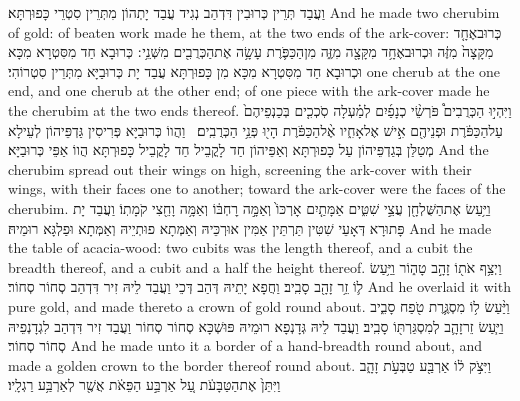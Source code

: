 {וַעֲבַד תְּרֵין כְּרוּבִין דִּדְהַב נְגִיד עֲבַד יָתְהוֹן מִתְּרֵין סִטְרֵי כָּפוּרְתָּא׃}
{And he made two cherubim of gold: of beaten work made he them, at the two ends of the ark-cover:}{}
{כְּרוּב\maqqaf אֶחָ֤ד מִקָּצָה֙ מִזֶּ֔ה וּכְרוּב\maqqaf אֶחָ֥ד מִקָּצָ֖ה מִזֶּ֑ה מִן\maqqaf הַכַּפֹּ֛רֶת עָשָׂ֥ה אֶת\maqqaf הַכְּרֻבִ֖ים מִשְּׁנֵ֥י ׃}
{כְּרוּבָא חַד מִסִּטְרָא מִכָּא וּכְרוּבָא חַד מִסִּטְרָא מִכָּא מִן כָּפוּרְתָּא עֲבַד יָת כְּרוּבַיָּא מִתְּרֵין סִטְרוֹהִי׃}
{one cherub at the one end, and one cherub at the other end; of one piece with the ark-cover made he the cherubim at the two ends thereof.}{}
{וַיִּהְי֣וּ הַכְּרֻבִים֩ פֹּרְשֵׂ֨י כְנָפַ֜יִם לְמַ֗עְלָה סֹֽכְכִ֤ים בְּכַנְפֵיהֶם֙ עַל\maqqaf הַכַּפֹּ֔רֶת וּפְנֵיהֶ֖ם אִ֣ישׁ אֶל\maqqaf אָחִ֑יו אֶ֨ל\maqqaf הַכַּפֹּ֔רֶת הָי֖וּ פְּנֵ֥י הַכְּרֻבִֽים׃ \petucha }
{וַהֲווֹ כְּרוּבַיָּא פְּרִיסִין גַּדְפֵּיהוֹן לְעֵילָא מְטַלַּן בְּגַדְפֵּיהוֹן עַל כָּפוּרְתָּא וְאַפֵּיהוֹן חַד לָקֳבֵיל חַד לָקֳבֵיל כָּפוּרְתָּא הֲווֹ אַפֵּי כְּרוּבַיָּא׃}
{And the cherubim spread out their wings on high, screening the ark-cover with their wings, with their faces one to another; toward the ark-cover were the faces of the cherubim.}{}
{וַיַּ֥עַשׂ אֶת\maqqaf הַשֻּׁלְחָ֖ן עֲצֵ֣י שִׁטִּ֑ים אַמָּתַ֤יִם אׇרְכּוֹ֙ וְאַמָּ֣ה רׇחְבּ֔וֹ וְאַמָּ֥ה וָחֵ֖צִי קֹמָתֽוֹ׃}
{וַעֲבַד יָת פָּתוּרָא דְּאָעֵי שִׁטִּין תַּרְתֵּין אַמִּין אוּרְכֵּיהּ וְאַמְּתָא פוּתְיֵיהּ וְאַמְּתָא וּפַלְגָּא רוּמֵיהּ׃}
{And he made the table of acacia-wood: two cubits was the length thereof, and a cubit the breadth thereof, and a cubit and a half the height thereof.}{}
{וַיְצַ֥ף אֹת֖וֹ זָהָ֣ב טָה֑וֹר וַיַּ֥עַשׂ ל֛וֹ זֵ֥ר זָהָ֖ב סָבִֽיב׃}
{וַחֲפָא יָתֵיהּ דְּהַב דְּכֵי וַעֲבַד לֵיהּ זִיר דִּדְהַב סְחוֹר סְחוֹר׃}
{And he overlaid it with pure gold, and made thereto a crown of gold round about.}{}
{וַיַּ֨עַשׂ ל֥וֹ מִסְגֶּ֛רֶת טֹ֖פַח סָבִ֑יב וַיַּ֧עַשׂ זֵר\maqqaf זָהָ֛ב לְמִסְגַּרְתּ֖וֹ סָבִֽיב׃}
{וַעֲבַד לֵיהּ גְּדָנְפָא רוּמֵיהּ פּוּשְׁכָּא סְחוֹר סְחוֹר וַעֲבַד זִיר דִּדְהַב לִגְדָנְפֵיהּ סְחוֹר סְחוֹר׃}
{And he made unto it a border of a hand-breadth round about, and made a golden crown to the border thereof round about.}{}
{וַיִּצֹ֣ק ל֔וֹ אַרְבַּ֖ע טַבְּעֹ֣ת זָהָ֑ב וַיִּתֵּן֙ אֶת\maqqaf הַטַּבָּעֹ֔ת עַ֚ל אַרְבַּ֣ע הַפֵּאֹ֔ת אֲשֶׁ֖ר לְאַרְבַּ֥ע רַגְלָֽיו׃}
